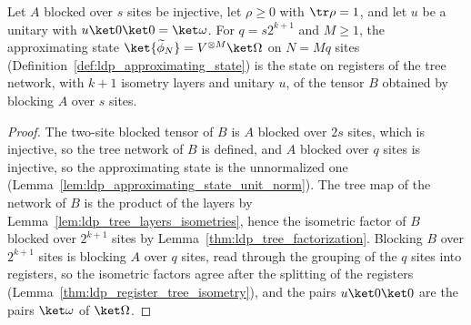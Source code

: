 \begin{lemma}
    \label{thm:ldp_approximating_state_register_mera}
    \leanok
    Let $A$ blocked over $s$ sites be injective, let $\rho\ge0$ with
    $\tr\rho=1$, and let $u$ be a unitary with $u\ket0\ket0=\ket\omega$. For
    $q=s2^{k+1}$ and $M\ge1$, the approximating state
    $\ket{\widetilde\phi_N}=V^{\otimes M}\ket\Omega$ on $N=Mq$ sites
    (Definition~\ref{def:ldp_approximating_state}) is the state on registers
    of the tree network, with $k+1$ isometry layers and unitary $u$, of the
    tensor $B$ obtained by blocking $A$ over $s$ sites.
\end{lemma}
\begin{proof}
    \leanok
    The two-site blocked tensor of $B$ is $A$ blocked over $2s$ sites, which
    is injective, so the tree network of $B$ is defined, and $A$ blocked over
    $q$ sites is injective, so the approximating state is the unnormalized
    one (Lemma~\ref{lem:ldp_approximating_state_unit_norm}). The tree map of
    the network of $B$ is the product of the layers by
    Lemma~\ref{lem:ldp_tree_layers_isometries}, hence the isometric factor of
    $B$ blocked over $2^{k+1}$ sites by
    Lemma~\ref{thm:ldp_tree_factorization}. Blocking $B$ over $2^{k+1}$ sites is blocking $A$ over $q$ sites,
    read through the grouping of the $q$ sites into registers, so the
    isometric factors agree after the splitting of the registers
    (Lemma~\ref{thm:ldp_register_tree_isometry}), and the pairs
    $u\ket0\ket0$ are the pairs $\ket\omega$ of $\ket\Omega$.
\end{proof}

